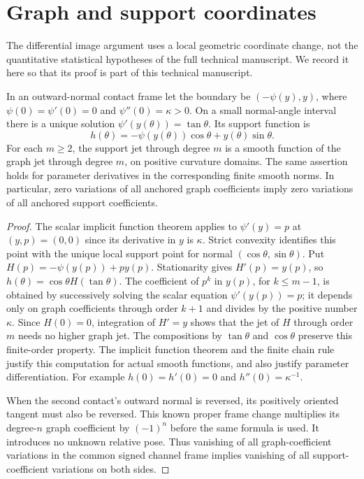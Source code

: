 \section{Graph and support coordinates}
\label{sec:v56-graph-support}

The differential image argument uses a local geometric coordinate change,
not the quantitative statistical hypotheses of the full technical
manuscript.  We record it here so that its proof is part of this technical
manuscript.

\begin{lemma}
\label{lem:v56-graph-support}
In an outward-normal contact frame let the boundary be $(-\psi(y),y)$,
where $\psi(0)=\psi'(0)=0$ and $\psi''(0)=\kappa>0$.
On a small normal-angle interval there is a unique solution
$\psi'(y(\theta))=\tan\theta$.  Its support function is
\begin{equation}\label{eq:v75-retained-graph-support}
 h(\theta)=-\psi(y(\theta))\cos\theta+y(\theta)\sin\theta.
\end{equation}
For each $m\ge2$, the support jet through degree $m$ is a smooth function
of the graph jet through degree $m$, on positive curvature domains.
The same assertion holds for parameter derivatives in the corresponding
finite smooth norms.  In particular, zero variations of all anchored
graph coefficients imply zero variations of all anchored support
coefficients.
\end{lemma}

\begin{proof}
The scalar implicit function theorem applies to $\psi'(y)=p$ at
$(y,p)=(0,0)$ since its derivative in $y$ is $\kappa$.  Strict convexity
identifies this point with the unique local support point for normal
$(\cos\theta,\sin\theta)$.  Put
$H(p)=-\psi(y(p))+py(p)$.  Stationarity gives $H'(p)=y(p)$, so
$h(\theta)=\cos\theta H(\tan\theta)$.
The coefficient of $p^k$ in $y(p)$, for $k\le m-1$, is obtained by
successively solving the scalar equation $\psi'(y(p))=p$; it depends
only on graph coefficients through order $k+1$ and divides by the
positive number $\kappa$.  Since $H(0)=0$, integration of $H'=y$
shows that the jet of $H$ through order $m$ needs no higher graph jet.
The compositions by $\tan\theta$ and $\cos\theta$ preserve this
finite-order property.  The implicit function theorem and the finite
chain rule justify this computation for actual smooth functions, and
also justify parameter differentiation.  For example $h(0)=h'(0)=0$
and $h''(0)=\kappa^{-1}$.

When the second contact's outward normal is reversed, its positively
oriented tangent must also be reversed.  This known proper frame change
multiplies its degree-$n$ graph coefficient by $(-1)^n$ before the same
formula is used.  It introduces no unknown relative pose.  Thus vanishing
of all graph-coefficient variations in the common signed channel frame
implies vanishing of all support-coefficient variations on both sides.
\end{proof}
